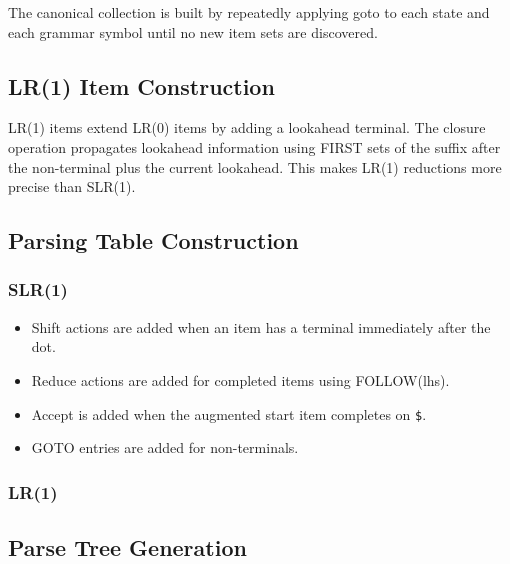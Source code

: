 \documentclass[12pt]{article}
\begin{document}
The canonical collection is built by repeatedly applying goto to each state and each grammar symbol until no new item sets are discovered.

\subsection{LR(1) Item Construction}

LR(1) items extend LR(0) items by adding a lookahead terminal. The closure operation propagates lookahead information using FIRST sets of the suffix after the non-terminal plus the current lookahead. This makes LR(1) reductions more precise than SLR(1).

\subsection{Parsing Table Construction}

\subsubsection{SLR(1)}
\begin{itemize}[leftmargin=1.5em]
    \item Shift actions are added when an item has a terminal immediately after the dot.
    \item Reduce actions are added for completed items using FOLLOW(lhs).
    \item Accept is added when the augmented start item completes on \texttt{\$}.
    \item GOTO entries are added for non-terminals.
\end{itemize}

\subsubsection{LR(1)}

\subsection{Parse Tree Generation}
\end{document}
